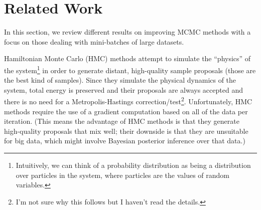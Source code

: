 \documentclass{article}
\begin{document}
\section{Related Work}\label{sec:related_work}

In this section, we review different results on improving MCMC methods with a focus on those dealing
with mini-batches of large datasets. 

Hamiltonian Monte Carlo (HMC) methods attempt to simulate the ``physics'' of the
system\footnote{Intuitively, we can think of a probability distribution as being a distribution over
particles in the system, where particles are the values of random variables.} in order to generate
distant, high-quality sample proposals (those are the best kind of samples). Since they simulate the
physical dynamics of the system, total energy is preserved and their proposals are always
accepted and there is no need for a Metropolis-Hastings correction/test\footnote{I'm not sure why
this follows but I haven't read the details.}. Unfortunately, HMC methods require the use of a
gradient computation based on all of the data per iteration. (This means the advantage of HMC
methods is that they generate high-quality proposals that mix well; their downside is that they are
unsuitable for big data, which might involve Bayesian posterior inference over that data.)
\end{document}
